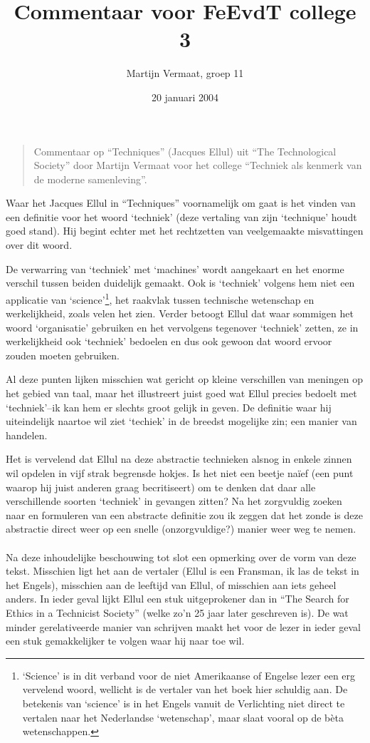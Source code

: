 \documentclass[11pt]{article}
\title{Commentaar voor FeEvdT college 3}
\author{
    Martijn Vermaat, groep 11
}
\date{20 januari 2004}
\begin{document}
\maketitle

\begin{quote}
Commentaar op ``Techniques'' (Jacques Ellul) uit ``The Technological Society'' door Martijn Vermaat voor het college ``Techniek als kenmerk van de moderne samenleving''.
\end{quote}

Waar het Jacques Ellul in ``Techniques'' voornamelijk om gaat is het vinden van een definitie voor het woord `techniek' (deze vertaling van zijn `technique' houdt goed stand). Hij begint echter met het rechtzetten van veelgemaakte misvattingen over dit woord.

De verwarring van `techniek' met `machines' wordt aangekaart en het enorme verschil tussen beiden duidelijk gemaakt. Ook is `techniek' volgens hem niet een applicatie van `science'\footnote{`Science' is in dit verband voor de niet Amerikaanse of Engelse lezer een erg vervelend woord, wellicht is de vertaler van het boek hier schuldig aan. De betekenis van `science' is in het Engels vanuit de Verlichting niet direct te vertalen naar het Nederlandse `wetenschap', maar slaat vooral op de b\`eta wetenschappen.}, het raakvlak tussen technische wetenschap en werkelijkheid, zoals velen het zien. Verder betoogt Ellul dat waar sommigen het woord `organisatie' gebruiken en het vervolgens tegenover `techniek' zetten, ze in werkelijkheid ook `techniek' bedoelen en dus ook gewoon dat woord ervoor zouden moeten gebruiken.

Al deze punten lijken misschien wat gericht op kleine verschillen van meningen op het gebied van taal, maar het illustreert juist goed wat Ellul precies bedoelt met `techniek'--ik kan hem er slechts groot gelijk in geven. De definitie waar hij uiteindelijk naartoe wil ziet `techiek' in de breedst mogelijke zin; een manier van handelen.

Het is vervelend dat Ellul na deze abstractie technieken alsnog in enkele zinnen wil opdelen in vijf strak begrensde hokjes. Is het niet een beetje na\"ief (een punt waarop hij juist anderen graag becritiseert) om te denken dat daar alle verschillende soorten `techniek' in gevangen zitten? Na het zorgvuldig zoeken naar en formuleren van een abstracte definitie zou ik zeggen dat het zonde is deze abstractie direct weer op een snelle (onzorgvuldige?) manier weer weg te nemen.

\paragraph{}

Na deze inhoudelijke beschouwing tot slot een opmerking over de vorm van deze tekst. Misschien ligt het aan de vertaler (Ellul is een Fransman, ik las de tekst in het Engels), misschien aan de leeftijd van Ellul, of misschien aan iets geheel anders. In ieder geval lijkt Ellul een stuk uitgeprokener dan in ``The Search for Ethics in a Technicist Society'' (welke zo'n 25 jaar later geschreven is). De wat minder gerelativeerde manier van schrijven maakt het voor de lezer in ieder geval een stuk gemakkelijker te volgen waar hij naar toe wil.
\end{document}
